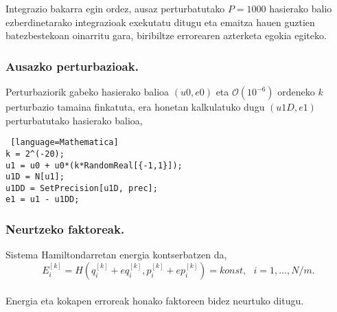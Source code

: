 Integrazio bakarra egin ordez, ausaz perturbatutako $P=1000$ hasierako balio ezberdinetarako integrazioak exekutatu ditugu eta emaitza hauen guztien batezbestekoan oinarritu gara, biribiltze errorearen azterketa egokia egiteko.    

\subsubsection*{Ausazko perturbazioak.}

Perturbaziorik gabeko hasierako balioa $(u0,e0)$ eta $\mathcal{O}(10^{-6})$ ordeneko $k$ perturbazio tamaina finkatuta, era honetan kalkulatuko dugu $(u1D,e1)$ perturbatutako hasierako balioa,
\begin{lstlisting} [language=Mathematica]
k = 2^(-20);
u1 = u0 + u0*(k*RandomReal[{-1,1}]);
u1D = N[u1];
u1DD = SetPrecision[u1D, prec];
e1 = u1 - u1DD;
\end{lstlisting}

\subsubsection*{Neurtzeko faktoreak.}

Sistema Hamiltondarretan energia kontserbatzen da,
\begin{equation*}
E_i^{[k]}=H(q_i^{[k]}+eq_i^{[k]},p_i^{[k]}+ep_i^{[k]})=konst, \ \ \ i=1,\dots,N/m.
\end{equation*}

\paragraph*{}Energia eta kokapen erroreak honako faktoreen bidez neurtuko ditugu.

